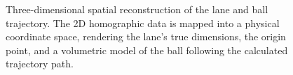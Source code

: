 \begin{figure}[htbp]
    \centering
    \caption{Three-dimensional spatial reconstruction of the lane and ball trajectory. The 2D homographic data is mapped into a physical coordinate space, rendering the lane's true dimensions, the origin point, and a volumetric model of the ball following the calculated trajectory path.}
    \label{fig:3d_reconstruction}
\end{figure}
